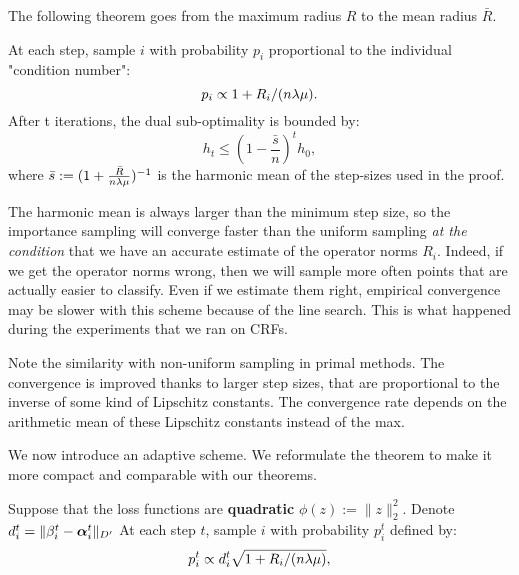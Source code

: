 \begin{subappendices}
The following theorem goes from the maximum radius $R$ to the mean radius $\bar R$.

\begin{theorem}
	\label{app:importance}
	At each step, sample $i$ with probability $p_i$ proportional to the individual "condition number":
	\begin{equation}
		p_i \propto 1+R_i/(n \lambda \mu).
	\end{equation}
	After t iterations, the dual sub-optimality is bounded by:
	\begin{equation}
		h_t \leq (1-\frac{\bar s}{n})^t  h_0,
	\end{equation}
	where $\bar s := (1 + \frac{\bar R}{n \lambda \mu})^{-1}$ is the harmonic mean of the step-sizes used in the proof.
\end{theorem}

The harmonic mean is always larger than the minimum step size, so the importance sampling will converge faster than the uniform sampling \textit{at the condition} that we have an accurate estimate of the operator norms $R_i$.
Indeed, if we get the operator norms wrong, then we will sample more often points that are actually easier to classify.
Even if we estimate them right, empirical convergence may be slower with this scheme because of the line search.
This is what happened during the experiments that we ran on CRFs.

Note the similarity with non-uniform sampling in primal methods.
The convergence is improved thanks to larger step sizes, that are proportional to the inverse of some kind of Lipschitz constants.
The convergence rate depends on the arithmetic mean of these Lipschitz constants instead of the max.

We now introduce an adaptive scheme. We reformulate the theorem to make it more compact and comparable with our theorems.

\begin{theorem}
	\label{app:csiba}
	Suppose that the loss functions are \textbf{quadratic} $\phi(z):=\|z\|_2^2$.
	Denote $d_i^t =  \|\beta_i^t - \boldsymbol{\alpha}_i^t \|_{D'}$
	At each step $t$, sample $i$ with probability $p_i^t$ defined by:
	\begin{equation}
		p_i^t \propto d_i^t \sqrt{1+R_i/(n \lambda \mu)},
	\end{equation}


\end{theorem}
\end{subappendices}
